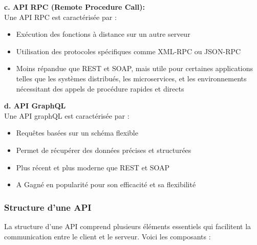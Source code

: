     \textbf{c. API RPC (Remote Procedure Call):} \\
    Une API RPC est caractérisée par  \cite[]{APIRPCGraphql}:
    \begin{itemize}
        \item Exécution des fonctions à distance sur un autre serveur
        \item Utilisation des protocoles spécifiques comme XML-RPC ou JSON-RPC
        \item Moins répandue que REST et SOAP, mais utile pour certaines applications telles que les systèmes distribués, les microservices, et les environnements nécessitant des appels de procédure rapides et directs  
    \end{itemize} 

    \textbf{d. API GraphQL } \\
    Une API graphQL est caractérisée par \cite[]{APIRPCGraphql}:
    \begin{itemize}
        \item Requêtes basées sur un schéma flexible
        \item Permet de récupérer des données précises et structurées
        \item Plus récent et plus moderne que REST et SOAP
        \item 	A Gagné en popularité pour son efficacité et sa flexibilité  
    \end{itemize} 

    \subsubsection{Structure d'une API}
    La structure d'une API comprend plusieurs éléments essentiels qui facilitent la communication entre le client et le serveur. Voici les composants :

